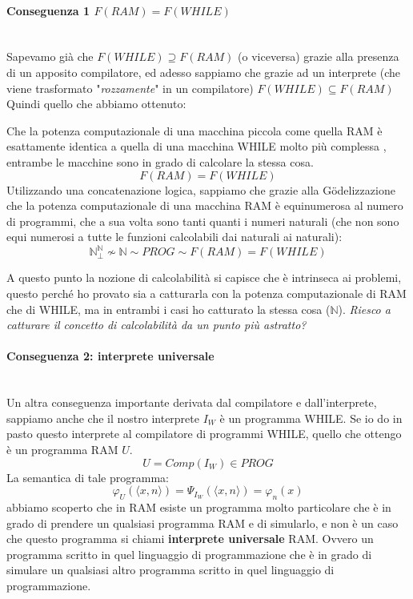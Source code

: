 \documentclass{article}
\begin{document}
\paragraph{Conseguenza 1 $F(RAM)=F(WHILE)$}\mbox{}\\
Sapevamo già che $F(WHILE)\supseteq F(RAM)$ (o viceversa) grazie alla presenza
di un apposito compilatore, ed adesso sappiamo che grazie ad un interprete
(che viene trasformato "\textit{rozzamente}" in un compilatore) $F(WHILE)\subseteq F(RAM)$
Quindi quello che abbiamo ottenuto:

Che la potenza computazionale di una macchina piccola come quella RAM è esattamente
identica a quella di una macchina WHILE molto più complessa , entrambe le macchine sono in
grado di calcolare la stessa cosa.
$$F(RAM)=F(WHILE)$$
Utilizzando una concatenazione logica, sappiamo che
grazie alla Gödelizzazione che la potenza computazionale di una macchina RAM è equinumerosa
al numero di programmi, che a sua volta sono tanti quanti i numeri naturali (che non sono
equi numerosi a tutte le funzioni calcolabili dai naturali ai naturali):
$$\mathbb{N}^{\mathbb{N}}_\bot\nsim\mathbb{N}\sim PROG \sim F(RAM)=F(WHILE)$$

A questo punto la nozione di calcolabilità si capisce che è intrinseca ai problemi,
questo perché ho provato sia a catturarla con la potenza computazionale di RAM che di WHILE,
ma in entrambi i casi ho catturato la stessa cosa ($\mathbb{N}$). \textit{Riesco
    a catturare il concetto di calcolabilità da un punto più astratto?}

\paragraph{Conseguenza 2: interprete universale}\mbox{}\\
Un altra conseguenza importante derivata dal compilatore e dall'interprete, sappiamo
anche che il nostro interprete $I_W$ è un programma WHILE. Se io do in pasto questo
interprete al compilatore di programmi WHILE, quello che ottengo è un programma
RAM $U$.
$$U=Comp(I_W)\in PROG$$
La semantica di tale programma:
$$\varphi_U\left(\langle x,n\rangle\right)=\Psi_{I_W}\left(\langle x,n\rangle\right)=\varphi_n\left( x\right)$$
abbiamo scoperto che in RAM esiste un programma molto particolare che è in
grado di prendere un qualsiasi programma RAM e di simularlo, e non è un caso che
questo programma si chiami \textbf{interprete universale} RAM. Ovvero un programma
scritto in quel linguaggio di programmazione che è in grado di simulare un qualsiasi
altro programma scritto in quel linguaggio di programmazione.
\end{document}
